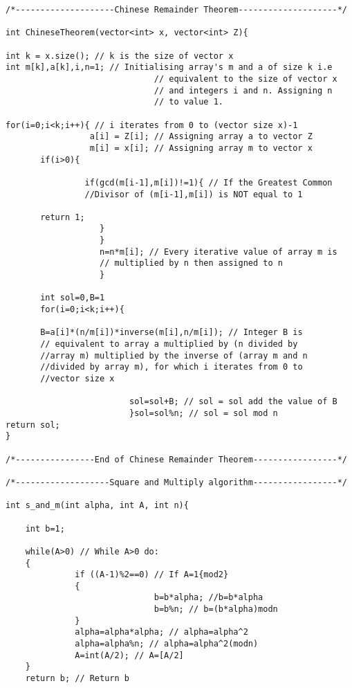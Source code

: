 \documentclass[iwp,first]{luthesis}
\begin{document}
\begin{verbatim}
/*--------------------Chinese Remainder Theorem--------------------*/

int ChineseTheorem(vector<int> x, vector<int> Z){ 

int k = x.size(); // k is the size of vector x
int m[k],a[k],i,n=1; // Initialising array's m and a of size k i.e 
                              // equivalent to the size of vector x 
                              // and integers i and n. Assigning n 
                              // to value 1.

for(i=0;i<k;i++){ // i iterates from 0 to (vector size x)-1
                 a[i] = Z[i]; // Assigning array a to vector Z
                 m[i] = x[i]; // Assigning array m to vector x 
       if(i>0){

                if(gcd(m[i-1],m[i])!=1){ // If the Greatest Common
                //Divisor of (m[i-1],m[i]) is NOT equal to 1
                 
       return 1;
                   }
                   }
                   n=n*m[i]; // Every iterative value of array m is
                   // multiplied by n then assigned to n
                   }

       int sol=0,B=1
       for(i=0;i<k;i++){
                         
       B=a[i]*(n/m[i])*inverse(m[i],n/m[i]); // Integer B is 
       // equivalent to array a multiplied by (n divided by 
       //array m) multiplied by the inverse of (array m and n
       //divided by array m), for which i iterates from 0 to 
       //vector size x
                         
                         sol=sol+B; // sol = sol add the value of B
                         }sol=sol%n; // sol = sol mod n
return sol;
}

/*----------------End of Chinese Remainder Theorem-----------------*/

/*-------------------Square and Multiply algorithm-----------------*/
       
int s_and_m(int alpha, int A, int n){
    
    int b=1;
    
    while(A>0) // While A>0 do:
    {
              if ((A-1)%2==0) // If A=1{mod2}
              {
                              b=b*alpha; //b=b*alpha
                              b=b%n; // b=(b*alpha)modn
              }
              alpha=alpha*alpha; // alpha=alpha^2
              alpha=alpha%n; // alpha=alpha^2(modn)
              A=int(A/2); // A=[A/2]
    }
    return b; // Return b
    

\end{verbatim}
\end{document}

